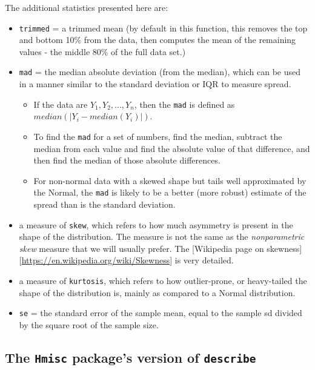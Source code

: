 \documentclass[
]{book}
\providecommand{\tightlist}{%
  \setlength{\itemsep}{0pt}\setlength{\parskip}{0pt}}
\begin{document}
The additional statistics presented here are:

\begin{itemize}
\tightlist
\item
  \texttt{trimmed} = a trimmed mean (by default in this function, this removes the top and bottom 10\% from the data, then computes the mean of the remaining values - the middle 80\% of the full data set.)
\item
  \texttt{mad} = the median absolute deviation (from the median), which can be used in a manner similar to the standard deviation or IQR to measure spread.

  \begin{itemize}
  \tightlist
  \item
    If the data are \(Y_1, Y_2, ..., Y_n\), then the \texttt{mad} is defined as \(median(|Y_i - median(Y_i)|)\).
  \item
    To find the \texttt{mad} for a set of numbers, find the median, subtract the median from each value and find the absolute value of that difference, and then find the median of those absolute differences.
  \item
    For non-normal data with a skewed shape but tails well approximated by the Normal, the \texttt{mad} is likely to be a better (more robust) estimate of the spread than is the standard deviation.
  \end{itemize}
\item
  a measure of \texttt{skew}, which refers to how much asymmetry is present in the shape of the distribution. The measure is not the same as the \emph{nonparametric skew} measure that we will usually prefer. The {[}Wikipedia page on skewness{]}{[}\url{https://en.wikipedia.org/wiki/Skewness}{]} is very detailed.
\item
  a measure of \texttt{kurtosis}, which refers to how outlier-prone, or heavy-tailed the shape of the distribution is, mainly as compared to a Normal distribution.
\item
  \texttt{se} = the standard error of the sample mean, equal to the sample sd divided by the square root of the sample size.
\end{itemize}

\hypertarget{the-hmisc-packages-version-of-describe}{%
\subsection{\texorpdfstring{The \texttt{Hmisc} package's version of \texttt{describe}}{The Hmisc package's version of describe}}\label{the-hmisc-packages-version-of-describe}}
\end{document}
